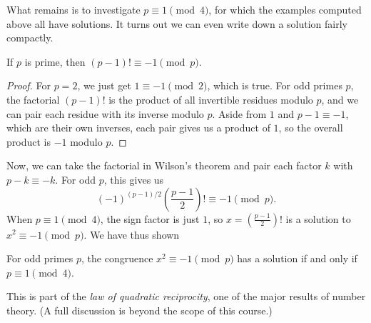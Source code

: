 What remains is to investigate $p\equiv 1\pmod{4}$, for which the examples computed above all have solutions. It turns out we can even write down a solution fairly compactly.
\begin{lemma}
If $p$ is prime, then $(p - 1)!\equiv -1\pmod{p}$.
\end{lemma}
\begin{proof}
For $p = 2$, we just get $1\equiv -1\pmod{2}$, which is true. For odd primes $p$, the factorial $(p - 1)!$ is the product of all invertible residues modulo $p$, and we can pair each residue with its inverse modulo $p$. Aside from $1$ and $p - 1\equiv -1$, which are their own inverses, each pair gives us a product of $1$, so the overall product is $-1$ modulo $p$.
\end{proof}
Now, we can take the factorial in Wilson's theorem and pair each factor $k$ with $p - k\equiv -k$. For odd $p$, this gives us
\begin{equation*}
(-1)^{(p - 1)/2}\left(\frac{p - 1}{2}\right)!\equiv -1\pmod{p}.
\end{equation*}
When $p\equiv 1\pmod{4}$, the sign factor is just $1$, so $x = (\frac{p - 1}{2})!$ is a solution to $x^2\equiv -1\pmod{p}$. We have thus shown

\begin{theorem}
For odd primes $p$, the congruence $x^2\equiv -1\pmod{p}$ has a solution if and only if $p\equiv 1\pmod{4}$.
\end{theorem}

This is part of the \emph{law of quadratic reciprocity}, one of the major results of number theory. (A full discussion is beyond the scope of this course.)